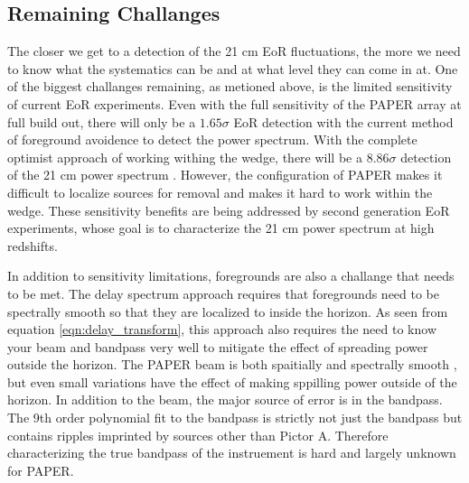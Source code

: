 \documentclass[twocolumn,numberedappendix]{emulateapj} \shorttitle{PSA64}
\begin{document}
\subsection{Remaining Challanges}
The closer we get to a detection of the 21 cm EoR fluctuations, the more we need
to know what the systematics can be and at what level they can come in at. One
of the biggest challanges remaining, as metioned above, is the limited
sensitivity of current EoR experiments. Even with the full sensitivity of the
PAPER array at full build out, there will only be a $1.65\sigma$ EoR detection
with the current method of foreground avoidence to detect the power spectrum.
With the complete optimist approach of working withing the wedge, there will be
a $8.86\sigma$ detection of the 21 cm power spectrum \citep{pober_et_al2014}.
However, the configuration of PAPER makes it difficult to localize sources for
removal and makes it hard to work within the wedge. These sensitivity benefits
are being addressed by second generation EoR experiments, whose goal is to
characterize the 21 cm power spectrum at high redshifts.

In addition to sensitivity limitations, foregrounds are also a challange that
needs to be met. The delay spectrum approach requires that foregrounds need to
be spectrally smooth so that they are localized to inside the horizon. As seen
from equation \ref{eqn:delay_transform}, this approach also requires the need to
know your beam and bandpass very well to mitigate the effect of spreading power
outside the horizon. The PAPER beam is both spaitially and spectrally smooth
\cite{pober_et_al2012}, but even small variations have the effect of
making sppilling power outside of the horizon. In addition to the beam, the
major source of error is in the bandpass. The 9th order polynomial fit to the
bandpass is strictly not just the bandpass but contains ripples imprinted by
sources other than Pictor A. Therefore characterizing the true bandpass of the
instruement is hard and largely unknown for PAPER.
\end{document}
